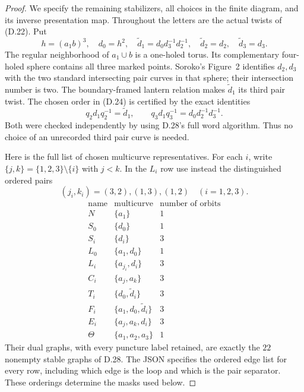 \begin{proof}
We specify the remaining stabilizers, all choices in the
finite diagram, and its inverse presentation map.
Throughout the letters are the actual twists of (D.22).
Put
\[
 h=(a_1b)^3,\quad d_0=h^2,\quad
 \widetilde d_1=d_0d_3^{-1}d_2^{-1},\quad
 \widetilde d_2=d_2,\quad\widetilde d_3=d_3.
                                                               \tag{D.24}
\]
The regular neighborhood of $a_1\cup b$ is a one-holed
torus.  Its complementary four-holed sphere contains
all three marked points.  Soroko's Figure~2 identifies
$d_2,d_3$ with the two standard intersecting pair curves
in that sphere; their intersection number is two.
The boundary-framed lantern relation makes
$\widetilde d_1$ its third pair twist.  The chosen order
in (D.24) is certified by the exact identities
\[
 q_2d_1q_2^{-1}=\widetilde d_1,\qquad
 q_3d_1q_3^{-1}=d_0d_2^{-1}d_3^{-1}.                  \tag{D.25}
\]
Both were checked independently by
 using D.28's full word algorithm.
Thus no choice of an unrecorded third pair curve is needed.

Here is the full list of chosen multicurve representatives.
For each $i$, write $\{j,k\}=\{1,2,3\}\setminus\{i\}$
with $j<k$.  In the $L_i$ row use instead the distinguished
ordered pairs
\[
             (j_i,k_i)=(3,2),(1,3),(1,2)
                       \quad(i=1,2,3).
\]
\[
\begin{array}{c|c|c}
\text{name}&\text{multicurve}&\text{number of orbits}\\\hline
N&\{a_1\}&1\\
S_0&\{d_0\}&1\\
S_i&\{d_i\}&3\\
L_0&\{a_1,d_0\}&1\\
L_i&\{a_{j_i},d_i\}&3\\
C_i&\{a_j,a_k\}&3\\
T_i&\{d_0,\widetilde d_i\}&3\\
F_i&\{a_1,d_0,\widetilde d_i\}&3\\
E_i&\{a_j,a_k,d_i\}&3\\
\Theta&\{a_1,a_2,a_3\}&1
\end{array}                                                     \tag{D.26}
\]
Their dual graphs, with every puncture label retained, are
exactly the $22$ nonempty stable graphs of D.28.
The JSON specifies the ordered edge list for every row,
including which edge is the loop and which is the pair
separator.  These orderings determine the masks used below.


\end{proof}
